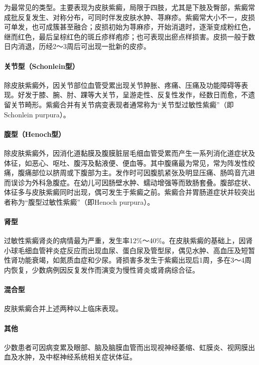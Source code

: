 为最常见的类型。主要表现为皮肤紫癜，局限于四肢，尤其是下肢及臀部，紫癜常成批反复发生、对称分布，可同时伴发皮肤水肿、荨麻疹。紫癜常大小不一，皮损可单发，也可成簇甚至融合；皮损初始为荨麻疹，开始消退时，逐渐变成粉红色，继而红色，最后呈棕红色的斑丘疹样疱疹；也可表现出瘀点样损害。皮损一般于数日内消退，历经2～3周后可出现一批新的皮疹。

\paragraph{关节型（Schonlein型）}

除皮肤紫癜外，因关节部位血管受累出现关节肿胀、疼痛、压痛及功能障碍等表现。好发于膝、腕、肘、踝等大关节，呈游走性、反复性发作，经数日而愈，不遗留关节畸形。紫癜合并有关节病变表现者通常称为“关节型过敏性紫癜”（即Schonlein
purpura）。

\paragraph{腹型（Henoch型）}

除皮肤紫癜外，因消化道黏膜及腹膜脏层毛细血管受累而产生一系列消化道症状及体征，如恶心、呕吐、腹泻及黏液便、便血等。其中腹痛最为常见，常为阵发性绞痛，腹痛部位以脐周或下腹部为主。发作时可因腹肌紧张及明显压痛、肠鸣音亢进而误诊为外科急腹症。在幼儿可因肠壁水肿、蠕动增强等而致肠套叠。腹部症状、体征多与皮肤紫癜同时出现，偶可发生于紫癜之前。紫癜合并胃肠道症状并较突出者称为“腹型过敏性紫癜”（即Henoch
purpura）。

\paragraph{肾型}

过敏性紫癜肾炎的病情最为严重，发生率12\%～40\%。在皮肤紫癜的基础上，因肾小球毛细血管袢炎症反应而出现血尿、蛋白尿及管型尿，偶见水肿、高血压及短暂性肾功能衰竭，如氮质血症和少尿。肾损害多发生于紫癜出现后1周，多在3～4周内恢复，少数病例因反复发作而演变为慢性肾炎或肾病综合征。

\paragraph{混合型}

皮肤紫癜合并上述两种以上临床表现。

\paragraph{其他}

少数患者可因病变累及眼部、脑及脑膜血管而出现视神经萎缩、虹膜炎、视网膜出血及水肿，及中枢神经系统相关症状体征。

